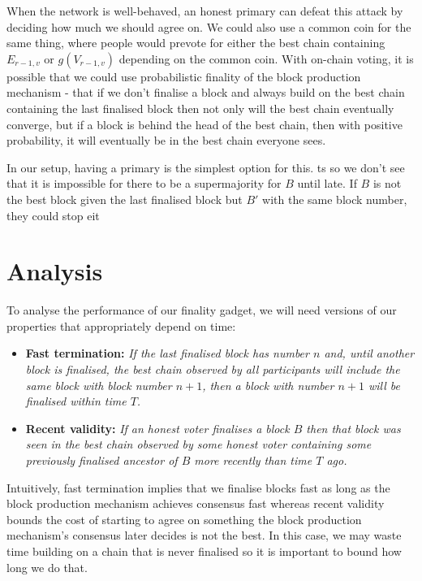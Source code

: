 \documentclass{article}
\begin{document}
{When the network is well-behaved, an honest primary can defeat this attack by deciding how much we should agree on. We could also use a common coin for the same thing, where people would prevote for either the best chain containing $E_{r-1,v}$ or $g(V_{r-1,v})$ depending on the common coin.
With on-chain voting, it is possible that we could use probabilistic finality of the block production mechanism - that if we don't finalise a block and always build on the best chain containing the last finalised block then not only will the best chain eventually converge, but if a block is behind the head of the best chain, then with positive probability, it will eventually be in the best chain everyone sees.

In our setup, having a primary is the simplest option for this.
ts so we don't see that it is impossible for there to be a supermajority for $B$ until late. 
If $B$ is not the best block given the last finalised block but $B'$  with the same block number, they could stop eit

}



\section{ Analysis }


To analyse the performance of our finality gadget, we will need versions of our properties that appropriately depend on time: 

\begin{itemize}
\item{\bf Fast termination:} {\em If the last finalised block has number $n$ and, until another block is finalised, the best chain observed by all participants will include the same block with block number $n+1$, then a block with number $n+1$ will be finalised within time $T$.}
\item{\bf Recent validity:} {\em If an honest voter finalises a block $B$ then that block was seen in the best chain observed by some honest voter containing some previously finalised ancestor of $B$ more recently than time $T$ ago.}
\end{itemize}

Intuitively, fast termination implies that we finalise blocks fast as long as the block production mechanism achieves consensus fast whereas recent validity bounds the cost of starting to agree on something the block production mechanism's consensus later decides is not the best. In this case, we may waste time building on a chain that is never finalised so it is important to bound how long we do that.
\end{document}
